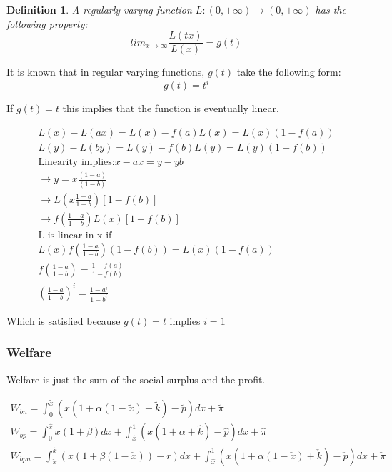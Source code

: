 \documentclass[12pt]{report}
\newtheorem{definition}{Definition}
\numberwithin{equation}{section}
\begin{document}
\begin{definition}
A regularly varyng function $L: (0,+ \infty) \rightarrow (0,+ \infty)$ has the following property:
\begin{equation}
lim_{x \rightarrow \infty} \frac{L(t x)}{L(x)} = g(t)
\end{equation}
\end{definition}

It is known that in regular varying functions, $g(t)$ take the following form\citep{bojanic1963slowly}:
\begin{equation}
g(t)=t^i
\end{equation}

If $g(t)= t$ this implies that the function is eventually linear. 

\begin{align}
L(x)-L(a x) = L(x) - f(a)L(x) = L(x)(1-f(a)) \\
L(y)-L(b y) = L(y) - f(b)L(y) = L(y)(1-f(b)) \\
\text{Linearity  implies:}
x-ax = y-yb \\
\rightarrow y = x \frac{(1-a)}{(1-b)} \\
\rightarrow L\left(x \frac{1-a}{1-b}\right)[1-f(b)] \\
\rightarrow f\left( \frac{1-a}{1-b}\right)L(x)[1-f(b)] \\
\text{L is linear in x if} \\
L(x)f\left(\frac{1-a}{1-b}\right)(1-f(b)) = L(x)(1-f(a)) \\
f\left(\frac{1-a}{1-b} \right) = \frac{1-f(a)}{1-f(b)} \\
\left(\frac{1-a}{1-b} \right)^i = \frac{1-a^i}{1-b^i} 
\end{align}

Which is satisfied because $g(t)=t$ implies $i=1$

\subsubsection{Welfare}

Welfare is just the sum of the social surplus and the profit.

\begin{align*}
W_{bn} = \int^{\tilde{x}}_0 \left(x(1+\alpha(1-\tilde{x})+\tilde{k})-\tilde{p} \right) dx + \tilde{\pi}  \\
W_{bp} = \int^{\hat{x}}_0 x(1+\beta) dx +\int^{1}_{\hat{x}} \left(x(1+\alpha+\hat{k}) - \hat{p} \right) dx + \hat{\pi} \\
W_{bpn} =
\int^{\hat{x}}_{\check{x}} \left(x(1+\beta(1-\check{x}))-r \right)dx +\int^{1}_{\hat{x}} \left(x(1+\alpha(1-\check{x})+\check{k}) - \check{p} \right) dx + \check{\pi}
\end{align*}
\end{document}
